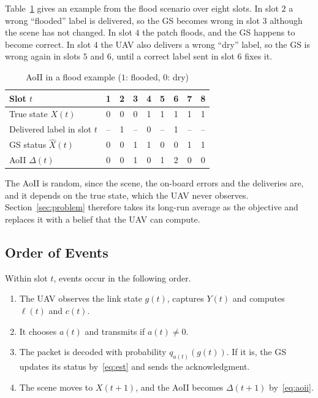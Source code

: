 \documentclass[5p,twocolumn]{elsarticle}
\theoremstyle{remark}
\newcommand{\lab}{\ell}
\begin{document}
Table~\ref{tab:aoiiex} gives an example from the flood scenario over eight slots. In slot $2$ a wrong ``flooded'' label is delivered, so the GS becomes wrong in slot $3$ although the scene has not changed. In slot $4$ the patch floods, and the GS happens to become correct. In slot $4$ the UAV also delivers a wrong ``dry'' label, so the GS is wrong again in slots $5$ and $6$, until a correct label sent in slot $6$ fixes it.

\begin{table}[t]
\caption{AoII in a flood example ($1$: flooded, $0$: dry)}\label{tab:aoiiex}
\centering\footnotesize
\setlength{\tabcolsep}{5pt}
\begin{tabular}{@{}lcccccccc@{}}
\toprule
Slot $t$ & 1 & 2 & 3 & 4 & 5 & 6 & 7 & 8\\
\midrule
True state $X(t)$ & 0 & 0 & 0 & 1 & 1 & 1 & 1 & 1\\
Delivered label in slot $t$ & -- & 1 & -- & 0 & -- & 1 & -- & --\\
GS status $\hat X(t)$ & 0 & 0 & 1 & 1 & 0 & 0 & 1 & 1\\
AoII $\Delta(t)$ & 0 & 0 & 1 & 0 & 1 & 2 & 0 & 0\\
\bottomrule
\end{tabular}
\end{table}

The AoII is random, since the scene, the on-board errors and the deliveries are, and it depends on the true state, which the UAV never observes. Section~\ref{sec:problem} therefore takes its long-run average as the objective and replaces it with a belief that the UAV can compute.

\subsection{Order of Events}\label{sec:events}
Within slot $t$, events occur in the following order.
\begin{enumerate}
\item The UAV observes the link state $g(t)$, captures $Y(t)$ and computes $\lab(t)$ and $c(t)$.
\item It chooses $a(t)$ and transmits if $a(t)\neq0$.
\item The packet is decoded with probability $q_{a(t)}(g(t))$. If it is, the GS updates its status by~\eqref{eq:est} and sends the acknowledgment.
\item The scene moves to $X(t+1)$, and the AoII becomes $\Delta(t+1)$ by~\eqref{eq:aoii}.
\end{enumerate}
\end{document}
